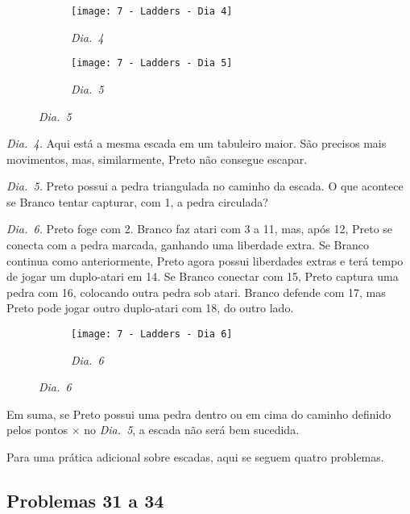 \pagebreak

\begin{figure}[h!]
    \centering
    \begin{subfigure}[t]{.4\textwidth}
        \centering
        \texttt{[image: 7 - Ladders - Dia 4]}
        \captionsetup{justification=centering}
        \caption*{\emph{Dia.\@~4}}
    \end{subfigure}
    \hspace{1cm}
    \begin{subfigure}[t]{.4\textwidth}
        \centering
        \texttt{[image: 7 - Ladders - Dia 5]}
        \captionsetup{justification=centering}
        \caption*{\emph{Dia.\@~5}}
    \end{subfigure}
\end{figure}

\emph{Dia.\@~4.} Aqui está a mesma escada em um tabuleiro maior. São precisos mais movimentos, mas, similarmente, Preto não consegue escapar.

\emph{Dia.\@~5.} Preto possui a pedra triangulada no caminho da escada. O que acontece se Branco tentar capturar, com 1, a pedra circulada?

\emph{Dia.\@~6.} Preto foge com 2. Branco faz atari com 3 a 11, mas, após 12, Preto se conecta com a pedra marcada, ganhando uma liberdade extra. Se Branco continua como anteriormente, Preto agora possui liberdades extras e terá tempo de jogar um duplo-atari em 14. Se Branco conectar com 15, Preto captura uma pedra com 16, colocando outra pedra sob atari. Branco defende com 17, mas Preto pode jogar outro duplo-atari com 18, do outro lado.

\begin{figure}[h!]
    \centering
    \begin{subfigure}[t]{.4\textwidth}
        \centering
        \texttt{[image: 7 - Ladders - Dia 6]}
        \captionsetup{justification=centering}
        \caption*{\emph{Dia.\@~6}}
    \end{subfigure}
\end{figure}

Em suma, se Preto possui uma pedra dentro ou em cima do caminho definido pelos pontos $\times$ no \emph{Dia.\@~5}, a escada não será bem sucedida.

Para uma prática adicional sobre escadas, aqui se seguem quatro problemas.

\pagebreak

\subsection{Problemas 31 a 34}

